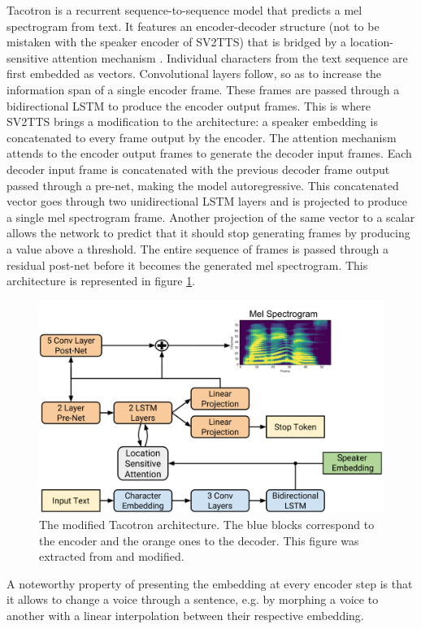\documentclass[a4paper, oneside, 12pt, english]{article}
\begin{document}
Tacotron is a recurrent sequence-to-sequence model that predicts a mel spectrogram from text. It features an encoder-decoder structure (not to be mistaken with the speaker encoder of SV2TTS) that is bridged by a location-sensitive attention mechanism \cite{Attention2}. Individual characters from the text sequence are first embedded as vectors. Convolutional layers follow, so as to increase the information span of a single encoder frame. These frames are passed through a bidirectional LSTM to produce the encoder output frames. This is where SV2TTS brings a modification to the architecture: a speaker embedding is concatenated to every frame output by the encoder. The attention mechanism attends to the encoder output frames to generate the decoder input frames. Each decoder input frame is concatenated with the previous decoder frame output passed through a pre-net, making the model autoregressive. This concatenated vector goes through two unidirectional LSTM layers and is projected to produce a single mel spectrogram frame. Another projection of the same vector to a scalar allows the network to predict that it should stop generating frames by producing a value above a threshold. The entire sequence of frames is passed through a residual post-net before it becomes the generated mel spectrogram. This architecture is represented in figure \ref{tacotron2_arch}.

\begin{figure}[h]
	\centering
	\includegraphics[width=0.7\linewidth]{images/tacotron2_arch.png}
	\caption{The modified Tacotron architecture. The blue blocks correspond to the encoder and the orange ones to the decoder. This figure was extracted from \citep{Tacotron2} and modified.}
	\label{tacotron2_arch}
\end{figure}


A noteworthy property of presenting the embedding at every encoder step is that it allows to change a voice through a sentence, e.g. by morphing a voice to another with a linear interpolation between their respective embedding.
\end{document}
